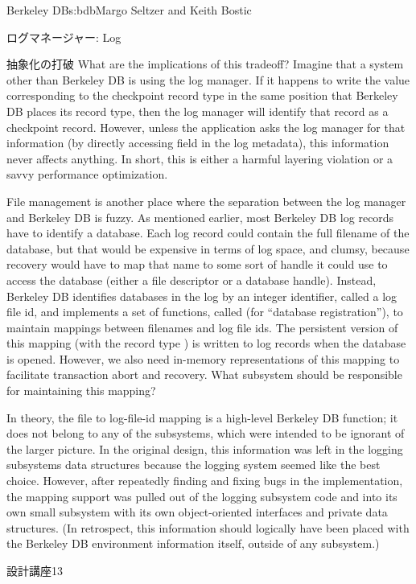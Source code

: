 \begin{aosachapter}{Berkeley DB}{s:bdb}{Margo Seltzer and Keith Bostic}
\begin{aosasect1}{ログマネージャー: Log}
\begin{aosasect2}{抽象化の打破}
What are the implications of this tradeoff? Imagine that a system
other than Berkeley DB is using the log manager. If it happens to
write the value corresponding to the checkpoint record type in the
same position that Berkeley DB places its record type, then the log
manager will identify that record as a checkpoint record. However,
unless the application asks the log manager for that information (by
directly accessing  field in the log metadata),
this information never affects anything. In short, this is either a
harmful layering violation or a savvy performance optimization.

File management is another place where the separation between the log
manager and Berkeley DB is fuzzy. As mentioned earlier, most Berkeley
DB log records have to identify a database. Each log record could
contain the full filename of the database, but that would be
expensive in terms of log space, and clumsy, because recovery would
have to map that name to some sort of handle it could use to access
the database (either a file descriptor or a database handle). Instead,
Berkeley DB identifies databases in the log by an integer identifier,
called a log file id, and implements a set of functions, called
 (for ``database registration''), to maintain mappings
between filenames and log file ids. The persistent version of this
mapping (with the record type )
is written to log records when the database is opened.  However, we also need
in-memory representations of this mapping to facilitate transaction
abort and recovery. What subsystem should be responsible for
maintaining this mapping?

In theory, the file to log-file-id mapping is a high-level Berkeley DB
function; it does not belong to any of the subsystems, which were
intended to be ignorant of the larger picture. In the original design,
this information was left in the logging subsystems data structures
because the logging system seemed like the best choice. However, after
repeatedly finding and fixing bugs in the implementation, the mapping
support was pulled out of the logging subsystem code and into its own
small subsystem with its own object-oriented interfaces and private
data structures.  (In retrospect, this information should logically
have been placed with the Berkeley DB environment information itself,
outside of any subsystem.) 

\begin{aosabox}{設計講座13}


\end{aosabox}
\end{aosasect2}
\end{aosasect1}
\end{aosachapter}
